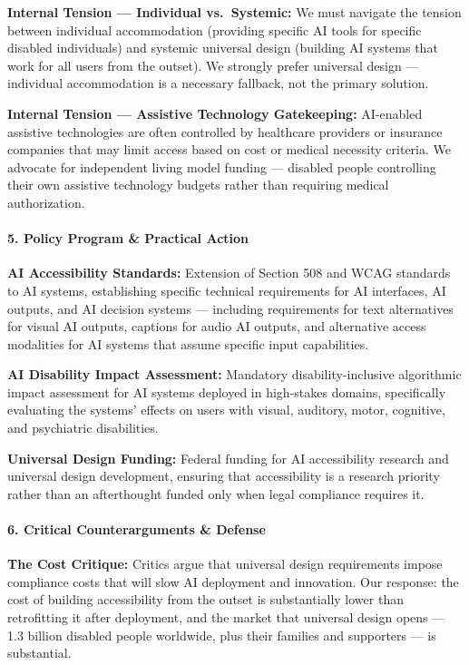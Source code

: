 \textbf{Internal Tension --- Individual vs.~Systemic:} We must navigate
the tension between individual accommodation (providing specific AI
tools for specific disabled individuals) and systemic universal design
(building AI systems that work for all users from the outset). We
strongly prefer universal design --- individual accommodation is a
necessary fallback, not the primary solution.

\textbf{Internal Tension --- Assistive Technology Gatekeeping:}
AI-enabled assistive technologies are often controlled by healthcare
providers or insurance companies that may limit access based on cost or
medical necessity criteria. We advocate for independent living model
funding --- disabled people controlling their own assistive technology
budgets rather than requiring medical authorization.

\paragraph{5. Policy Program \& Practical
Action}\label{policy-program-practical-action-40}

\textbf{AI Accessibility Standards:} Extension of Section 508 and WCAG
standards to AI systems, establishing specific technical requirements
for AI interfaces, AI outputs, and AI decision systems --- including
requirements for text alternatives for visual AI outputs, captions for
audio AI outputs, and alternative access modalities for AI systems that
assume specific input capabilities.

\textbf{AI Disability Impact Assessment:} Mandatory disability-inclusive
algorithmic impact assessment for AI systems deployed in high-stakes
domains, specifically evaluating the systems' effects on users with
visual, auditory, motor, cognitive, and psychiatric disabilities.

\textbf{Universal Design Funding:} Federal funding for AI accessibility
research and universal design development, ensuring that accessibility
is a research priority rather than an afterthought funded only when
legal compliance requires it.

\paragraph{6. Critical Counterarguments \&
Defense}\label{critical-counterarguments-defense-40}

\textbf{The Cost Critique:} Critics argue that universal design
requirements impose compliance costs that will slow AI deployment and
innovation. Our response: the cost of building accessibility from the
outset is substantially lower than retrofitting it after deployment, and
the market that universal design opens --- 1.3 billion disabled people
worldwide, plus their families and supporters --- is substantial.

